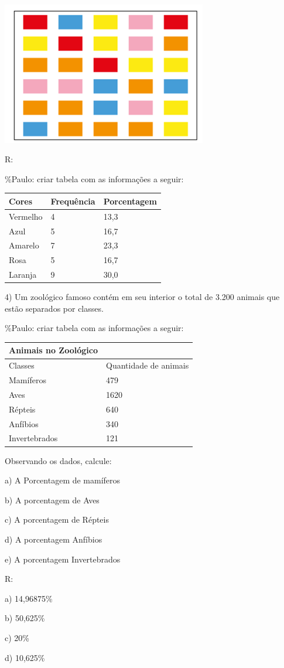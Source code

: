 \includegraphics[width=3.52292in,height=2.45347in]{./imgSAEB_6_MAT/media/image82.png}

R:

\%Paulo: criar tabela com as informações a seguir:

\begin{longtable}[]{@{}lll@{}}
\toprule
Cores & Frequência & Porcentagem\tabularnewline
\midrule
\endhead
Vermelho & 4 & 13,3\tabularnewline
Azul & 5 & 16,7\tabularnewline
Amarelo & 7 & 23,3\tabularnewline
Rosa & 5 & 16,7\tabularnewline
Laranja & 9 & 30,0\tabularnewline
\bottomrule
\end{longtable}

4) Um zoológico famoso contém em seu interior o total de 3.200 animais
que estão separados por classes.

\%Paulo: criar tabela com as informações a seguir:

\begin{longtable}[]{@{}ll@{}}
\toprule
Animais no Zoológico &\tabularnewline
\midrule
\endhead
Classes & Quantidade de animais\tabularnewline
Mamíferos & 479\tabularnewline
Aves & 1620\tabularnewline
Répteis & 640\tabularnewline
Anfíbios & 340\tabularnewline
Invertebrados & 121\tabularnewline
\bottomrule
\end{longtable}

Observando os dados, calcule:

a) A Porcentagem de mamíferos

b) A porcentagem de Aves

c) A porcentagem de Répteis

d) A porcentagem Anfíbios

e) A porcentagem Invertebrados

R:

a) 14,96875\%

b) 50,625\%

c) 20\%

d) 10,625\%


